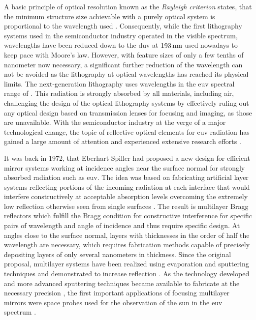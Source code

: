 A basic principle of optical resolution known as the \emph{Rayleigh criterion} states, that the minimum structure size achievable with a purely optical system is proportional to the wavelength used \cite{lord_rayleigh_xxxi._1879}. Consequently, while the first lithography systems used in the semiconductor industry operated in the visible spectrum, wavelengths have been reduced down to the \gls{duv} at $\nm{193}$ used nowadays to keep pace with Moore's law. However, with feature sizes of only a few tenths of nanometer now necessary, a significant further reduction of the wavelength can not be avoided as the lithography at optical wavelengths has reached its physical limits. The next-generation lithography uses wavelengths in the \gls{euv} spectral range of . This radiation is strongly absorbed by all materials, including air, challenging the design of the optical lithography systems by effectively ruling out any optical design based on transmission lenses for focusing and imaging, as those are unavailable. With the semiconductor industry at the verge of a major technological change, the topic of reflective optical elements for \gls{euv} radiation has gained a large amount of attention and experienced extensive research efforts \cite{bakshi_euv_2009}.

It was back in 1972, that Eberhart Spiller had proposed a new design for efficient mirror systems working at incidence angles near the surface normal for strongly absorbed radiation such as \gls{euv}. The idea was based on fabricating artificial layer systems reflecting portions of the incoming radiation at each interface that would interfere constructively at acceptable absorption levels overcoming the extremely low reflection otherwise seen from single surfaces \cite{spiller_low-loss_1972}. The result is multilayer Bragg reflectors which fulfill the Bragg condition for constructive interference for specific pairs of wavelength and angle of incidence and thus require specific design. At angles close to the surface normal, layers with thicknesses in the order of half the wavelength are necessary, which requires fabrication methods capable of precisely depositing layers of only several nanometers in thickness. Since the original proposal, multilayer systems have been realized using evaporation and sputtering techniques and demonstrated to increase reflection \cite{spiller_reflective_1976, underwood_layered_1981}. As the technology developed and more advanced sputtering techniques became available to fabricate at the necessary precision \cite{stearns_fabrication_1991}, the first important applications of focusing multilayer mirrors were space probes used for the observation of the sun in the \gls{euv} spectrum \cite{chauvineau_description_1992, clette_eit:_1995, spiller_soft_1994}.

